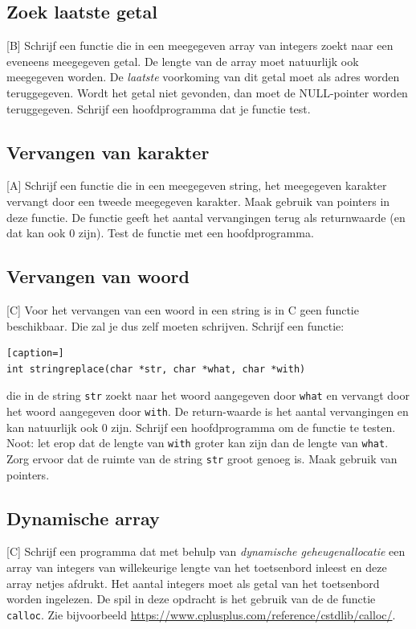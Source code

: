\documentclass[a4paper,10pt,fleqn,twoside]{article}
\begin{document}
\subsection{Zoek laatste getal}[B]
Schrijf een functie die in een meegegeven array van integers zoekt naar een eveneens meegegeven getal. De lengte van de array moet natuurlijk ook meegegeven worden. De \textsl{laatste} voorkoming van dit getal moet als adres worden teruggegeven. Wordt het getal niet gevonden, dan moet de NULL-pointer worden teruggegeven. Schrijf een hoofdprogramma dat je functie test.

\subsection{Vervangen van karakter}[A]
Schrijf een functie die in een meegegeven string, het meegegeven karakter vervangt door een tweede meegegeven karakter. Maak gebruik van pointers in deze functie. De functie geeft het aantal vervangingen terug als returnwaarde (en dat kan ook 0 zijn). Test de functie met een hoofdprogramma.

\subsection{Vervangen van woord}[C]
Voor het vervangen van een woord in een string is in C geen functie beschikbaar. Die zal je dus zelf moeten schrijven. Schrijf een functie:

\begin{lstlisting}[caption=]
int stringreplace(char *str, char *what, char *with)
\end{lstlisting}

die in de string \lstinline|str| zoekt naar het woord aangegeven door \lstinline|what| en vervangt door het woord aangegeven door \lstinline|with|. De return-waarde is het aantal vervangingen en kan natuurlijk ook 0 zijn. Schrijf een hoofdprogramma om de functie te testen. Noot: let erop dat de lengte van \lstinline|with| groter kan zijn dan de lengte van \lstinline|what|. Zorg ervoor dat de ruimte van de string \lstinline|str| groot genoeg is. Maak gebruik van pointers.

\subsection{Dynamische array}[C]
Schrijf een programma dat met behulp van \textsl{dynamische geheugenallocatie} een array van integers van willekeurige lengte van het toetsenbord inleest en deze array netjes afdrukt. Het aantal integers moet als getal van het toetsenbord worden ingelezen. De spil in deze opdracht is het gebruik van de de functie \lstinline|calloc|. Zie bijvoorbeeld \url{https://www.cplusplus.com/reference/cstdlib/calloc/}.
\end{document}

